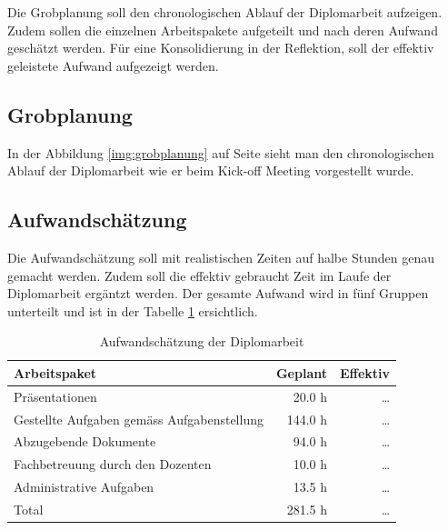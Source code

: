   Die Grobplanung soll den chronologischen Ablauf der Diplomarbeit aufzeigen.
  Zudem sollen die einzelnen Arbeitspakete aufgeteilt und nach deren Aufwand
  geschätzt werden. Für eine Konsolidierung in der Reflektion, soll der effektiv
  geleistete Aufwand aufgezeigt werden.
  
  \subsection{Grobplanung}
  
  In der Abbildung \ref{img:grobplanung} auf Seite
  \pageref{img:grobplanung} sieht man den chronologischen Ablauf der
  Diplomarbeit wie er beim Kick-off Meeting vorgestellt wurde.
  
  \subsection{Aufwandschätzung}
  
  Die Aufwandschätzung soll mit realistischen Zeiten auf halbe Stunden
  genau gemacht werden. Zudem soll die effektiv gebraucht Zeit im Laufe der
  Diplomarbeit ergäntzt werden. Der gesamte Aufwand wird in fünf Gruppen
  unterteilt und ist in der Tabelle \ref{tab:planing} ersichtlich.
  \newline
  
  \begin{table}[ht]
    \sffamily 
    \begin{center}
      \begin{tabular}{p{9cm}rr}
        \toprule
        \textbf{Arbeitspaket} & \textbf{Geplant} & \textbf{Effektiv} \\
        \midrule
        Präsentationen &
        20.0 h &
        \ldots\\
        Gestellte Aufgaben gemäss Aufgabenstellung &
        144.0 h &
        \ldots\\
        Abzugebende Dokumente &
        94.0 h &
        \ldots\\
        Fachbetreuung durch den Dozenten &
        10.0 h &
        \ldots\\
        Administrative Aufgaben &
        13.5 h &
        \ldots\\
        \bottomrule
        Total &
        281.5 h &
        \ldots\\
        \bottomrule
      \end{tabular}
      \caption{Aufwandschätzung der Diplomarbeit}
      \label{tab:planing}
    \end{center}
  \end{table}
    
